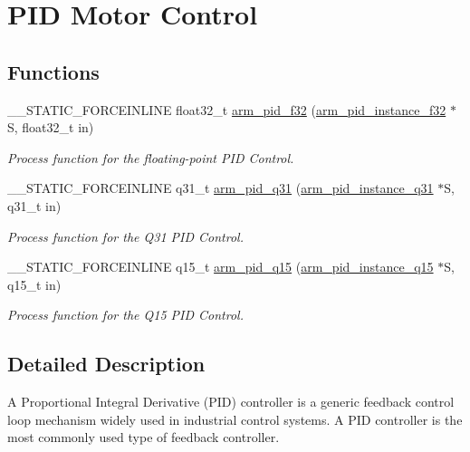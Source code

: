 \hypertarget{group___p_i_d}{}\section{P\+ID Motor Control}
\label{group___p_i_d}
\subsection*{Functions}
\begin{DoxyCompactItemize}
\item 
\+\_\+\+\_\+\+S\+T\+A\+T\+I\+C\+\_\+\+F\+O\+R\+C\+E\+I\+N\+L\+I\+NE float32\+\_\+t \mbox{\hyperlink{group___p_i_d_ga5a6865ed706b7dd969ef0bd58a61f306}{arm\+\_\+pid\+\_\+f32}} (\mbox{\hyperlink{structarm__pid__instance__f32}{arm\+\_\+pid\+\_\+instance\+\_\+f32}} $\ast$S, float32\+\_\+t in)
\begin{DoxyCompactList}\small\item\em Process function for the floating-\/point P\+ID Control. \end{DoxyCompactList}\item 
\+\_\+\+\_\+\+S\+T\+A\+T\+I\+C\+\_\+\+F\+O\+R\+C\+E\+I\+N\+L\+I\+NE q31\+\_\+t \mbox{\hyperlink{group___p_i_d_ga9ead8b3180125fb42879389477b99dc8}{arm\+\_\+pid\+\_\+q31}} (\mbox{\hyperlink{structarm__pid__instance__q31}{arm\+\_\+pid\+\_\+instance\+\_\+q31}} $\ast$S, q31\+\_\+t in)
\begin{DoxyCompactList}\small\item\em Process function for the Q31 P\+ID Control. \end{DoxyCompactList}\item 
\+\_\+\+\_\+\+S\+T\+A\+T\+I\+C\+\_\+\+F\+O\+R\+C\+E\+I\+N\+L\+I\+NE q15\+\_\+t \mbox{\hyperlink{group___p_i_d_ga7ecc87208cb297fb9a31cec4f18bb54e}{arm\+\_\+pid\+\_\+q15}} (\mbox{\hyperlink{structarm__pid__instance__q15}{arm\+\_\+pid\+\_\+instance\+\_\+q15}} $\ast$S, q15\+\_\+t in)
\begin{DoxyCompactList}\small\item\em Process function for the Q15 P\+ID Control. \end{DoxyCompactList}\end{DoxyCompactItemize}


\subsection{Detailed Description}
A Proportional Integral Derivative (P\+ID) controller is a generic feedback control loop mechanism widely used in industrial control systems. A P\+ID controller is the most commonly used type of feedback controller.

